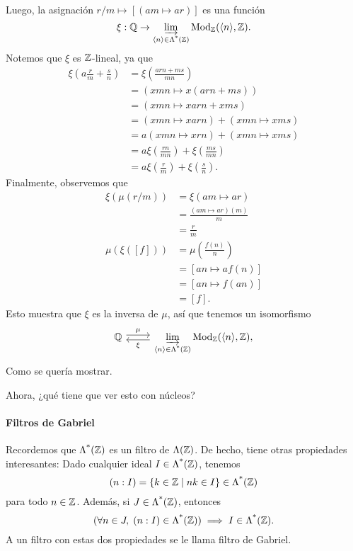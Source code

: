 Luego, la asignación $r/m\mapsto [(am\mapsto ar)]$
es una función
\[
    \xi:\mathbb Q\to\varinjlim_{\langle n\rangle\in\Lambda^{\text{*}}({\mathbb Z})}\mathrm{Mod}_\mathbb Z(\langle n\rangle,\mathbb Z)
.\]
Notemos que $\xi$ es $\mathbb Z$-lineal, ya que
\begin{align*}
    \xi\left(a\frac r m + \frac s n\right)
    &= \xi\left(\frac{arn + ms}{mn}\right) \\
    &= \left( xmn \mapsto x(arn+ms) \right) \\
    &= (xmn \mapsto xarn+xms) \\
    &= (xmn \mapsto xarn) + (xmn \mapsto xms) \\
    &= a(xmn \mapsto xrn) + (xmn \mapsto xms) \\
    &= a\xi\left(\frac{rn}{mn}\right)
        + \xi\left(\frac{ms}{mn}\right) \\
    &= a\xi\left(\frac{r}{m}\right)
        + \xi\left(\frac{s}{n}\right).
\end{align*}
Finalmente, observemos que
\begin{align*}
    \xi(\mu(r/m))
    &= \xi(am\mapsto ar) \\
    &= \frac{(am\mapsto ar)(m)}{m} \\
    &= \frac{r}{m} \\
    \mu(\xi([f]))
    &= \mu\left(\frac{f(n)} n \right) \\
    &= [an\mapsto af(n)] \\
    &= [an\mapsto f(an)] \\
    &= [f]
.\end{align*}
Esto muestra que $\xi$ es la inversa de $\mu$,
así que tenemos un isomorfismo
\[
    \begin{tikzcd}
    \mathbb Q \ar[r,shift left,"\mu"] &
    \displaystyle
    \varinjlim_{\<n\>\in\nti\Z}\Mod_\Z(\<n\>,\Z),
    \ar[l,shift left,"\xi"]
   \end{tikzcd} 
\]
Como se quería mostrar.

Ahora, ¿qué tiene que ver esto con núcleos?

\paragraph{Filtros de Gabriel}
Recordemos que $\Lambda^{\text{*}}({\mathbb Z})$ es un filtro de $\Lambda(\mathbb Z)$.
De hecho, tiene otras propiedades interesantes:
Dado cualquier ideal $I\in\Lambda^{\text{*}}({\mathbb Z})$, tenemos
\[
    (n:I)=\{k\in\mathbb Z\mid nk\in I\}\in\Lambda^{\text{*}}({\mathbb Z})
\]
para todo $n\in\mathbb Z$.
Además, si $J\in\Lambda^{\text{*}}({\mathbb Z})$, entonces
\[
    (\forall n\in J,\; (n:I)\in\Lambda^{\text{*}}({\mathbb Z}))\implies I\in\Lambda^{\text{*}}({\mathbb Z})
.\]
A un filtro con estas dos propiedades se le llama filtro de Gabriel.

